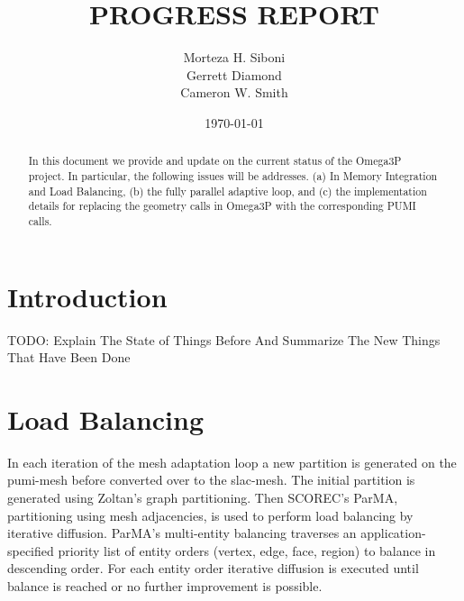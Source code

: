 \documentclass[review,authoryear,12pt]{elsarticle_summary_report}
\begin{document}
\title{PROGRESS REPORT}%

\author[]{Morteza H. Siboni \\
Gerrett Diamond \\
Cameron W. Smith}



\date{\today}



\begin{abstract}
  In this document we provide and update on the current status of the Omega3P project. In particular, the following issues will be addresses. (a) In Memory Integration and Load Balancing, (b) the fully parallel adaptive loop, and (c) the implementation details for replacing the geometry calls in Omega3P  with the corresponding PUMI calls.
\end{abstract}


\maketitle




\section{Introduction}
TODO: Explain The State of Things Before And Summarize The New Things That Have Been Done

\section{Load Balancing}
In each iteration of the mesh adaptation loop a new partition is generated on the
pumi-mesh before converted over to the slac-mesh. The initial partition is generated
using Zoltan's graph partitioning. Then SCOREC's ParMA, partitioning using mesh adjacencies,
is used to perform load balancing by iterative diffusion. ParMA's multi-entity balancing
traverses an application-specified priority list of entity orders (vertex, edge, face,
region) to balance in descending order.
For each entity order iterative diffusion is executed until balance is reached
or no further improvement is possible.
\end{document}
